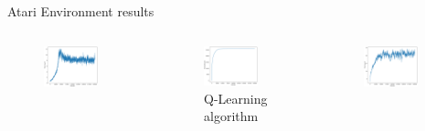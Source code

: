 \begin{frame}{Atari Environment results}
    \begin{columns}[c,onlytextwidth]
            \begin{figure}
                \centering
                \includegraphics[width=0.8\textwidth]{images/atari-ql-total-reward.png}
            \end{figure}
            \begin{figure}
                \centering
                \includegraphics[width=0.8\textwidth]{images/atari-ql-explored-states.png}
		\caption{Q-Learning algorithm}
            \end{figure}
            \begin{figure}
                \centering
                \includegraphics[width=0.8\textwidth]{images/atari-sarsa-total-reward.png}

\end{figure}
\end{columns}
\end{frame}
